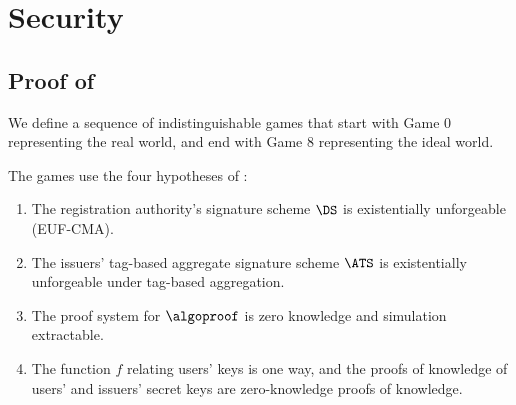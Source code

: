 \section{Security}\label{sec:agg-creds-security}


\subsection{Proof of }\label{sec:agg-creds-proof-1}

We define a sequence of indistinguishable games
that start with Game 0 representing the real world, and end with Game 8
representing the ideal world.

The games use the four hypotheses of
:

\begin{enumerate}

  \item[(P1)] The registration authority's signature scheme $\DS$ is
existentially unforgeable (EUF-CMA).

  \item[(P2)] The issuers' tag-based aggregate signature scheme $\ATS$ is
existentially unforgeable under tag-based aggregation.

  \item[(P3)] The proof system for $\algoproof$ is zero knowledge and
simulation extractable.

  \item[(P4)] The function $f$ relating users' keys is one way, and the proofs
of knowledge of users' and issuers' secret keys are zero-knowledge proofs of
knowledge.

\end{enumerate}

